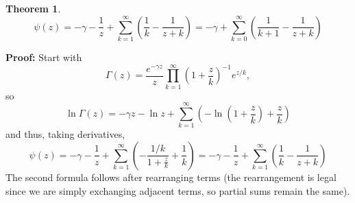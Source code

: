 \documentclass[12pt]{article}
\newtheorem{thm}{Theorem}
\begin{document}
\begin{thm}
\[\psi (z) = - \gamma -\frac{1}{z} +
\sum_{k=1}^\infty \left( \frac{1}{k} - \frac{1}{z + k} \right)=-\gamma+\sum_{k=0}^{\infty}\left(\frac{1}{k+1}-\frac{1}{z+k}\right)\]
\end{thm}
\textbf{Proof:}
Start with
\[
\Gamma(z) = \frac{e^{-\gamma z}}{z}
\prod_{k=1}^\infty \left(1 + \frac{z}{k}\right)^{-1} e^{z/k},
\]
so
\[
\ln\Gamma(z)=-\gamma z - \ln z +\sum_{k=1}^{\infty}\left(-\ln\left(1+\frac{z}{k}\right)+\frac{z}{k}\right)\]
and thus, taking derivatives,
\[\psi(z)=-\gamma-\frac{1}{z}+\sum_{k=1}^{\infty}\left(-\frac{1/k}{1+\frac{z}{k}}+\frac{1}{k}\right)
=-\gamma-\frac{1}{z}+\sum_{k=1}^{\infty}\left(\frac{1}{k}-\frac{1}{z+k}\right)\]
The second formula follows after rearranging terms (the rearrangement is legal since we are simply exchanging adjacent terms, so partial sums remain the same).

\end{document}
